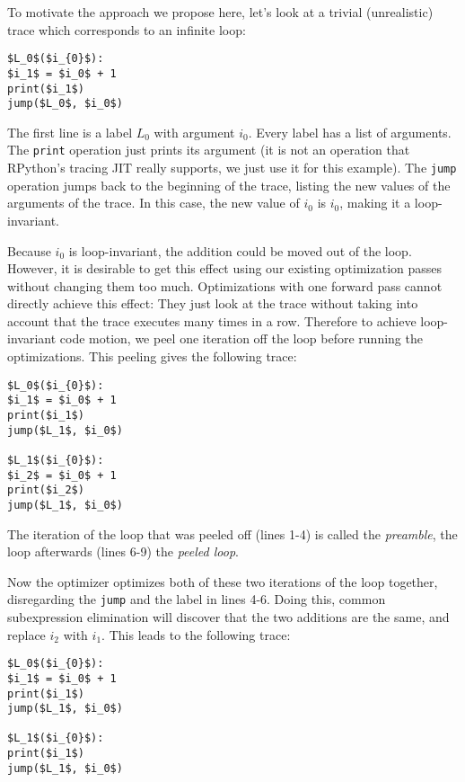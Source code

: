 \documentclass[preprint]{sigplanconf}
\begin{document}
To motivate the approach we propose here, let's look at a trivial (unrealistic)
trace which corresponds to an infinite loop:


\begin{lstlisting}[mathescape,numbers = right,basicstyle=\setstretch{1.05}\ttfamily\scriptsize]
$L_0$($i_{0}$):
$i_1$ = $i_0$ + 1
print($i_1$)
jump($L_0$, $i_0$)
\end{lstlisting}

The first line is a label $L_0$ with argument $i_0$. Every label has a list of
arguments. The \lstinline{print} operation just prints its argument (it is not
an operation that RPython's tracing JIT really supports, we just use it for this
example). The \lstinline{jump} operation jumps back to the beginning of the
trace, listing the new values of the arguments of the trace. In this case, the
new value of $i_0$ is $i_0$, making it a loop-invariant.

Because $i_0$ is loop-invariant, the addition could be moved out of the loop.
However, it is desirable to get this effect using our existing optimization passes
without changing them too much. Optimizations with one forward pass
cannot directly achieve this effect: They just look at the trace without taking
into account that the trace executes many times in a row. Therefore to achieve
loop-invariant code motion, we peel one iteration off the loop before running
the optimizations. This peeling gives the following trace:

\begin{lstlisting}[mathescape,numbers = right,basicstyle=\setstretch{1.05}\ttfamily\scriptsize]
$L_0$($i_{0}$):
$i_1$ = $i_0$ + 1
print($i_1$)
jump($L_1$, $i_0$)

$L_1$($i_{0}$):
$i_2$ = $i_0$ + 1
print($i_2$)
jump($L_1$, $i_0$)
\end{lstlisting}

The iteration of the loop that was peeled off (lines 1-4) is called the
\emph{preamble}, the loop afterwards (lines 6-9) the \emph{peeled loop}.

Now the optimizer optimizes both of these two iterations of the loop together,
disregarding the \lstinline{jump} and the label in lines 4-6. Doing this, common
subexpression elimination will discover that the two additions are the same, and
replace $i_2$ with $i_1$. This leads to the following trace:

\begin{lstlisting}[mathescape,numbers = right,basicstyle=\setstretch{1.05}\ttfamily\scriptsize]
$L_0$($i_{0}$):
$i_1$ = $i_0$ + 1
print($i_1$)
jump($L_1$, $i_0$)

$L_1$($i_{0}$):
print($i_1$)
jump($L_1$, $i_0$)
\end{lstlisting}
\end{document}
